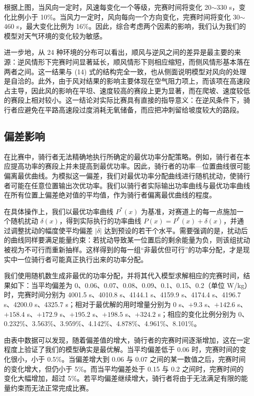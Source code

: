 \documentclass[11pt,a4paper]{ctexart}
\begin{document}
根据上图，当风向一定时，风速每变化一个等级，完赛时间将变化 20$\sim$330 s，变化比例小于 10\%。当风力一定时，风向每向一个方向变化，完赛时间将变化 30$\sim$460 s，最大变化比例为 16\%。因此，综合考虑两个因素的影响，我们认为我们的模型对天气环境的变化较为敏感。

进一步地，从 24 种环境的分布可以看出，顺风与逆风之间的差异是最主要的来源：逆风情形下完赛时间显著延长，顺风情形下则相应缩短，而侧风情形基本落在两者之间。这一结果与 (14) 式的结构完全一致，也从侧面说明模型对风向的处理是自洽的。此外，由于风对结果的影响主要体现在空气阻力项上，而该项在高速段占主导，因此风的影响在平坦、速度较高的赛段上更为显著，而在爬坡、速度较低的赛段上相对较小。这一结论对实际比赛具有直接的指导意义：在逆风条件下，骑行者应避免在平路高速段过度消耗无氧储备，而应把冲刺留给坡度较大的路段。

\subsection{偏差影响}

在比赛中，骑行者无法精确地执行所确定的最优功率分配策略。例如，骑行者在本应提高功率的赛段上并未提高到最优功率。因此，骑行者的功率—位置曲线很可能偏离最优曲线。为模拟这一偏差，我们对最优功率分配曲线进行随机扰动，使骑行者可能在任意位置输出次优功率。我们以骑行者实际输出功率曲线与最优功率曲线在所有位置上偏差绝对值的平均值，作为骑行者偏离最优曲线的程度。

在具体操作上，我们以最优功率曲线 $P^{\ast}(x)$ 为基准，对赛道上的每一点施加一个随机扰动 $\delta(x)$，得到实际执行的功率曲线 $P(x) = P^{\ast}(x) + \delta(x)$，并通过调整扰动的幅度使平均偏差 $\overline{|\delta|}$ 达到预设的若干个水平。需要强调的是，扰动后的曲线同样要满足能量约束：若扰动导致某一位置后的剩余能量为负，则该组扰动被视为不可行而重新抽样。这样得到的每一组“非最优但可行”的功率分配，才是现实中一位骑行者可能真正执行出来的功率分配。

我们使用随机数生成非最优的功率分配，并将其代入模型求解相应的完赛时间，结果如下：当平均偏差为 0、0.06、0.07、0.08、0.09、0.1、0.15、0.2（单位 W/kg）时，完赛时间分别为 4001.5 s、4010.8 s、4144.1 s、4159.9 s、4174.4 s、4196.7 s、4200.0 s、4325.7 s；相对于最优解的用时增量分别为 0 s、$+9.3$ s、$+142.6$ s、$+158.4$ s、$+172.9$ s、$+195.2$ s、$+198.5$ s、$+324.2$ s；相应的变化比例分别为 0、0.232\%、3.563\%、3.959\%、4.142\%、4.878\%、4.961\%、8.101\%。

由表中数据可以发现，随着偏差值的增大，骑行者的完赛时间逐渐增加，这在一定程度上验证了我们的模型确实是最优解。当平均偏差低于 0.06 时，完赛时间的变化很小，小于 0.5\%。当偏差增大到 0.06 与 0.07 之间的某一数值之后，完赛时间的变化增大，但仍小于 5\%。而当平均偏差处于 0.15 与 0.2 之间时，完赛时间的变化大幅增加，超过 5\%。若平均偏差继续增大，骑行者将由于无法满足有限的能量约束而无法正常完成比赛。
\end{document}
